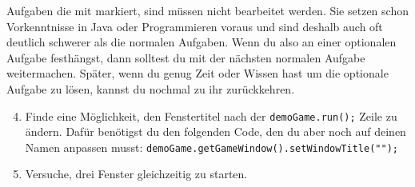 \begin{Infobox}
    Aufgaben die mit \optional markiert, sind müssen nicht bearbeitet werden.
    Sie setzen schon Vorkenntnisse in Java oder Programmieren voraus und sind deshalb auch oft deutlich schwerer als die normalen Aufgaben.
    Wenn du also an einer optionalen Aufgabe festhängst, dann solltest du mit der nächsten normalen Aufgabe weitermachen.
    Später, wenn du genug Zeit oder Wissen hast um die optionale Aufgabe zu lösen, kannst du nochmal zu ihr zurückkehren.
\end{Infobox}


\begin{enumerate} \setcounter{enumi}{3}
\item \optional Finde eine Möglichkeit, den Fenstertitel nach der \lstinline{demoGame.run();} Zeile zu ändern.
Dafür benötigst du den folgenden Code, den du aber noch auf deinen Namen anpassen musst: \lstinline{demoGame.getGameWindow().setWindowTitle("");}
\item \optional Versuche, drei Fenster gleichzeitig zu starten.
\end{enumerate}
